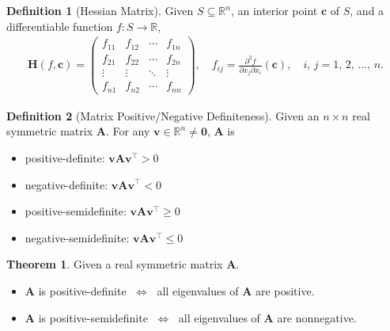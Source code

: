 \documentclass[10pt]{beamer}
\newcommand{\ds}{\displaystyle}
\newcommand{\ifff}{\;\Longleftrightarrow\;}
\theoremstyle{definition}
\newtheorem*{dfn}{Definition}
\newtheorem*{thm}{Theorem}
\newcommand{\vc}{\mathbf{c}}
\newcommand{\vv}{\mathbf{v}}
\newcommand{\vH}{\mathbf{H}}
\newcommand{\vA}{\mathbf{A}}
\newcommand{\vZero}{\mathbf{0}}
\begin{document}
\begin{frame}
  \begin{dfn}[Hessian Matrix]
    Given $\ds S\subseteq\mathbb{R}^n$, an interior point $\vc$ of $S$, and a differentiable function $\ds f:S\to\mathbb{R}$, \vspace{-3mm}
    \begin{align*}
      \vH(f, \vc) = \begin{pmatrix}f_{11} & f_{12} & \cdots & f_{1n} \\ f_{21} & f_{22} & \cdots & f_{2n} \\ \vdots & \vdots & \ddots & \vdots \\ f_{n1} & f_{n2} & \cdots & f_{nn}\end{pmatrix}, \quad f_{ij} = \frac{\partial^2 f}{\partial x_j\partial x_i}(\vc), \quad i,\,j = 1,\,2,\,\ldots,\,n.
    \end{align*}
  \end{dfn}

  \begin{dfn}[Matrix Positive/Negative Definiteness] 
    Given an $n\times n$ real symmetric matrix $\vA$. For any $\ds\vv\in\mathbb{R}^n\ne\vZero$, $\vA$ is \vspace{-3mm}
    \begin{multicols}{2}
      \begin{itemize}
        \item positive-definite: $\ds\vv\vA\vv^\top > 0$ 
        \item negative-definite: $\ds\vv\vA\vv^\top < 0$
        \item positive-semidefinite: $\ds\vv\vA\vv^\top\geqslant 0$
        \item negative-semidefinite: $\ds\vv\vA\vv^\top\leqslant 0$
      \end{itemize}
    \end{multicols}
  \end{dfn}
  \begin{thm}
    Given a real symmetric matrix $\vA$.  
    \begin{itemize}
      \item $\vA$ is positive-definite $\ifff$ all eigenvalues of $\vA$ are positive.  
      \item $\vA$ is positive-semidefinite $\ifff$ all eigenvalues of $\vA$ are nonnegative.
    \end{itemize}
  \end{thm}

\end{frame}
\end{document}
